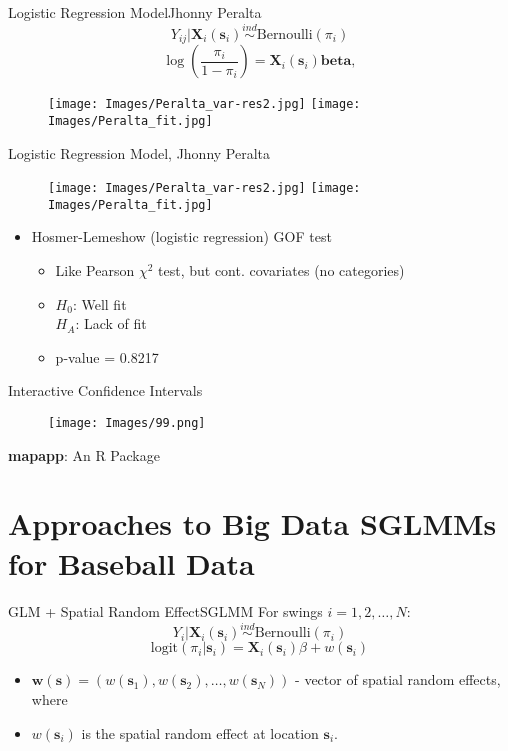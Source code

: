 \documentclass{beamer}
\begin{document}
\begin{frame}{Logistic Regression Model}{Jhonny Peralta} %
$$Y_{ij}|\mathbf{X}_{i}(\mathbf{s}_{i}) \stackrel{ind}{\sim} \mbox{Bernoulli}(\pi_{i}) $$
$$ \log\left(\frac{\pi_{i}}{1-\pi_{i}}\right) = \mathbf{X}_{i}(\mathbf{s}_{i})\pmb{beta},
$$  
  \begin{figure}[H]
	\centering
	\texttt{[image: Images/Peralta\_var-res2.jpg]}
	\texttt{[image: Images/Peralta\_fit.jpg]}
	\end{figure}

\end{frame}

\begin{frame}{Logistic Regression Model, Jhonny Peralta} %
  \begin{figure}[H]
	\centering
	\texttt{[image: Images/Peralta\_var-res2.jpg]}
	\texttt{[image: Images/Peralta\_fit.jpg]}
	\end{figure}
\begin{itemize}
\addtolength{\itemsep}{0.5\baselineskip}
\item Hosmer-Lemeshow (logistic regression) GOF test
  \begin{itemize}
  \addtolength{\itemsep}{0.5\baselineskip}
  \item Like Pearson $\chi^{2}$ test, but cont. covariates (no categories)
  \item $H_0$: Well fit \\ $H_A$: Lack of fit
  \item p-value = 0.8217
  \end{itemize}
\end{itemize}
\end{frame}

\begin{frame}{Interactive Confidence Intervals}{} %
  \begin{figure}[H]
	\centering
	\texttt{[image: Images/99.png]}
	\end{figure}
{\bf mapapp}: An R Package
\end{frame}

\section{Approaches to Big Data SGLMMs for Baseball Data}

\begin{frame}{GLM + Spatial Random Effect}{SGLMM}
For swings $i = 1, 2, \dots, N$:
$$ Y_{i}|\mathbf{X}_{i}(\mathbf{s}_{i}) \stackrel{ind}{\sim} \mbox{Bernoulli}(\pi_{i}) $$
$$\text{logit}(\pi_{i}|\pmb{s}_{i}) = \mathbf{X}_{i}(\mathbf{s}_{i})\beta + w(\pmb{s}_{i}) $$\begin{itemize}
\item $\pmb{w}(\pmb{s}) = (w(\pmb{s}_{1}), w(\pmb{s}_{2}), \dots, w(\pmb{s}_{N}))$  - vector of spatial random effects, where 
\item $w(\pmb{s}_{i})$ is the spatial random effect at location $\pmb{s}_{i}$. 
\end{itemize}
\end{frame}
\end{document}
